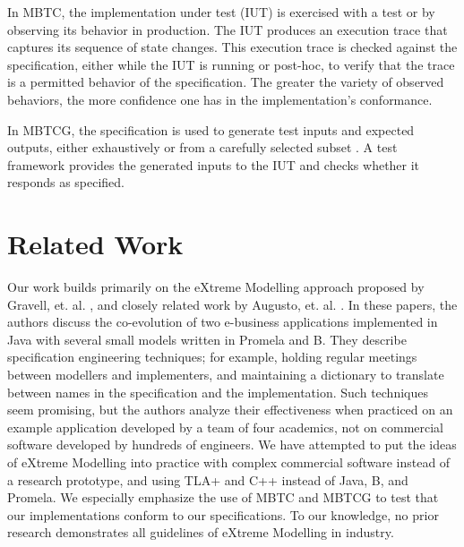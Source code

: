 \documentclass{vldb}
\begin{document}
In MBTC, the implementation under test (IUT) is exercised with a test or by observing its behavior in production.
The IUT produces an execution trace that captures its sequence of state changes.
This execution trace is checked against the specification, either while the IUT is running or post-hoc, to verify that the trace is a permitted behavior of the specification.
The greater the variety of observed behaviors, the more confidence one has in the implementation's conformance.

In MBTCG, the specification is used to generate test inputs and expected outputs, either exhaustively or from a carefully selected subset \cite{Dick93AutomatingGenerationOfTests}.
A test framework provides the generated inputs to the IUT and checks whether it responds as specified.


\section{Related Work}
\label{sec:related_work}

Our work builds primarily on the eXtreme Modelling approach proposed by Gravell, et. al. \cite{Gravell11ConcurrentDevelopmentOfModelAndImplementation}, and closely related work by Augusto, et. al. \cite{Augusto03ValidatingBusinessSystems}. 
In these papers, the authors discuss the co-evolution of two e-business applications implemented in Java with several small models written in Promela and B.
They describe specification engineering techniques; for example, holding regular meetings between modellers and implementers, and maintaining a dictionary to translate between names in the specification and the implementation.
Such techniques seem promising, but the authors analyze their effectiveness when practiced on an example application developed by a team of four academics, not on commercial software developed by hundreds of engineers.
We have attempted to put the ideas of eXtreme Modelling into practice with complex commercial software instead of a research prototype, and using TLA+ and C++ instead of Java, B, and Promela.
We especially emphasize the use of MBTC and MBTCG to test that our implementations conform to our specifications.
To our knowledge, no prior research demonstrates all guidelines of eXtreme Modelling in industry.
\end{document}
